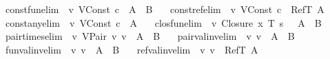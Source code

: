 \begin{isabellebody}
\ \ const{\isacharunderscore}fun{\isacharbrackleft}elim{\isacharbang}{\isacharbrackright}{\isacharcolon}\ {\isachardoublequoteopen}{\isasymSigma}\ {\isasymturnstile}v\ {\isacharparenleft}VConst\ c{\isacharparenright}\ {\isacharcolon}\ {\isacharparenleft}A\ {\isasymrightarrow}\ B{\isacharparenright}{\isachardoublequoteclose}\ \isanewline
\ \ const{\isacharunderscore}ref{\isacharbrackleft}elim{\isacharbang}{\isacharbrackright}{\isacharcolon}\ {\isachardoublequoteopen}{\isasymSigma}\ {\isasymturnstile}v\ {\isacharparenleft}VConst\ c{\isacharparenright}\ {\isacharcolon}\ RefT\ A{\isachardoublequoteclose}\ \isanewline
\ \ const{\isacharunderscore}any{\isacharbrackleft}elim{\isacharbang}{\isacharbrackright}{\isacharcolon}\ {\isachardoublequoteopen}{\isasymSigma}\ {\isasymturnstile}v\ {\isacharparenleft}VConst\ c{\isacharparenright}\ {\isacharcolon}\ A{\isachardoublequoteclose}\ \isanewline
\ \ clos{\isacharunderscore}fun{\isacharbrackleft}elim{\isacharbang}{\isacharbrackright}{\isacharcolon}\ {\isachardoublequoteopen}{\isasymSigma}\ {\isasymturnstile}v\ {\isacharparenleft}Closure\ x\ T\ s\ {\isasymrho}{\isacharparenright}\ {\isacharcolon}\ {\isacharparenleft}A\ {\isasymrightarrow}\ B{\isacharparenright}{\isachardoublequoteclose}\ \isanewline
\ \ pair{\isacharunderscore}times{\isacharbrackleft}elim{\isacharbang}{\isacharbrackright}{\isacharcolon}\ {\isachardoublequoteopen}{\isasymSigma}\ {\isasymturnstile}v\ {\isacharparenleft}VPair\ v{}\ v{}{\isacharparenright}\ {\isacharcolon}\ {\isacharparenleft}A\ {\isasymtimes}\ B{\isacharparenright}{\isachardoublequoteclose}\ \isanewline
\ \ pairval{\isacharunderscore}inv{\isacharbrackleft}elim{\isacharbang}{\isacharbrackright}{\isacharcolon}\ {\isachardoublequoteopen}{\isasymSigma}\ {\isasymturnstile}v\ v\ {\isacharcolon}\ {\isacharparenleft}A\ {\isasymtimes}\ B{\isacharparenright}{\isachardoublequoteclose}\ \isanewline
\ \ funval{\isacharunderscore}inv{\isacharbrackleft}elim{\isacharbang}{\isacharbrackright}{\isacharcolon}\ {\isachardoublequoteopen}{\isasymSigma}\ {\isasymturnstile}v\ v\ {\isacharcolon}\ {\isacharparenleft}A\ {\isasymrightarrow}\ B{\isacharparenright}{\isachardoublequoteclose}\ \isanewline
\ \ refval{\isacharunderscore}inv{\isacharbrackleft}elim{\isacharbang}{\isacharbrackright}{\isacharcolon}\ {\isachardoublequoteopen}{\isasymSigma}\ {\isasymturnstile}v\ v\ {\isacharcolon}\ {\isacharparenleft}RefT\ A{\isacharparenright}{\isachardoublequoteclose}\isanewline
\isanewline

\end{isabellebody}
